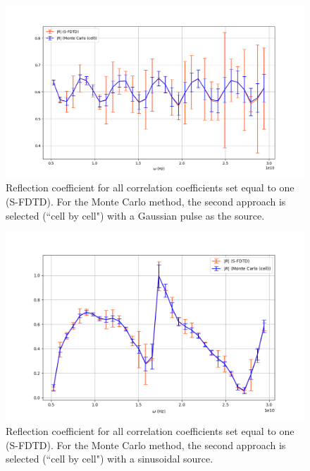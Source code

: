 \documentclass[12pt, oneside]{book}
\begin{document}
\begin{figure}
\centering
\includegraphics[scale=0.48]{Rsfdtdmcgausscellcorr1(8).png}
\caption{Reflection coefficient for all correlation coefficients set equal to one (S-FDTD). For the Monte Carlo method, the second approach is selected (``cell by cell") with a Gaussian pulse as the source.}\label{stdR(8)}
\end{figure}

\begin{figure}
\centering
\includegraphics[scale=0.48]{Rsfdtdmcsincell(11).png}
\caption{Reflection coefficient for all correlation coefficients set equal to one (S-FDTD). For the Monte Carlo method, the second approach is selected (``cell by cell") with a sinusoidal source.}\label{stdR(11)}
\end{figure}
\end{document}
